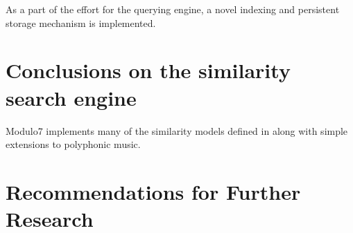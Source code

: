 \noindent As a part of the effort for the querying engine, a novel indexing and persistent storage mechanism is implemented. 

\section{Conclusions on the similarity search engine}

\noindent Modulo7 implements many of the similarity models defined in \cite{similietechnicalmanual} along with simple extensions to polyphonic music. 

\section{Recommendations for Further Research}

\noindent 